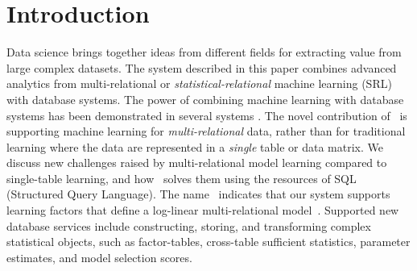 \section{Introduction} Data science brings together ideas from different fields for extracting value from large complex datasets. The system described in this paper combines advanced analytics from multi-relational or {\em statistical-relational} machine learning (SRL) with database systems. The power of combining machine learning with database systems has been demonstrated in several systems 
%
\cite{MADlib_VLDB_2012,MLbase_ICDR_2013,Deshpande2006}.
The novel contribution of \FB\ is supporting machine learning for {\em multi-relational} data, rather than for traditional learning where the  data are represented in a {\em single} table or data matrix. 
%
We discuss new challenges raised by multi-relational model learning compared to single-table learning, and how \FB\ solves them using the resources of SQL (Structured Query Language). The name \FB\ indicates that our system supports learning factors that define a log-linear multi-relational model~\cite{Kimmig2015}. Supported new database services include constructing, storing, and transforming complex statistical objects, such as factor-tables, cross-table sufficient statistics, parameter estimates, and model selection scores.


